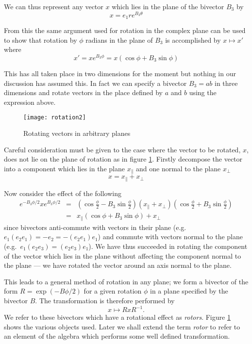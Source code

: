 We can thus represent any vector $x$ which lies in the plane of the
bivector $B_3$ by
\[
x=e_1re^{B_3\theta}
\]

From this the same argument used for rotation in the complex plane 
can be used to show that rotation by
$\phi$ radians in the plane of $B_3$ is accomplished by $x \mapsto x'$
where
\begin{displaymath}
x' = xe^{B_3\phi} = x (\cos \phi + B_3 \sin \phi)
\end{displaymath}

This has all taken place in two dimensions for the moment but nothing in our
discussion has assumed this. In fact we can specify a bivector $B_3 = ab$ in
three dimensions and rotate vectors in the place defined by $a$ and $b$ using
the expression above.

\begin{figure}
\centering
\texttt{[image: rotation2]}
\caption{Rotating vectors in arbitrary planes\label{fig:rotation2}}
\end{figure}

Careful consideration must be given to the case where the vector to be
rotated, $x$, does not lie on the plane of rotation as in figure
\ref{fig:rotation2}. Firstly decompose the
vector into a component which lies in the plane $x_\parallel$ and one
normal to the plane $x_\perp$
\[
x = x_\parallel + x_\perp
\]

Now consider the effect of the following
\begin{eqnarray*}
e^{-B_3\phi/2}
x
e^{B_3\phi/2}
& = & \left(\cos \frac{\phi}{2} - B_3 \sin \frac{\phi}{2}\right)
(x_\parallel + x_\perp )
\left(\cos \frac{\phi}{2} + B_3 \sin \frac{\phi}{2}\right) \\
& = & x_\parallel (\cos \phi + B_3 \sin \phi) + x_\perp
\end{eqnarray*}
since bivectors anti-commute with vectors in their plane (e.g. 
$e_1(e_2e_1) = -e_2 = -(e_2e_1)e_1$) and commute with
vectors normal to the plane (e.g.\ $e_1(e_2e_3) = (e_2e_3)e_1$).
We have thus succeeded in rotating the component of the vector 
which lies in the plane without affecting the component normal
to the plane --- we have rotated the vector around an axis normal to
the plane.

This leads to a general method of rotation in any plane; we
form a bivector of the form $R = \exp({-B\phi/2})$ for a given rotation 
$\phi$ in a plane specified by the bivector $B$. The transformation
is therefore performed by
\begin{displaymath}
x \mapsto RxR^{-1}.
\end{displaymath}
We refer to these bivectors which have a rotational effect as \emph{rotors}.
Figure \ref{fig:rotation2} shows the various objects used. Later we shall
extend the term \emph{rotor} to refer to an element of the algebra which
performs some well defined transformation.

